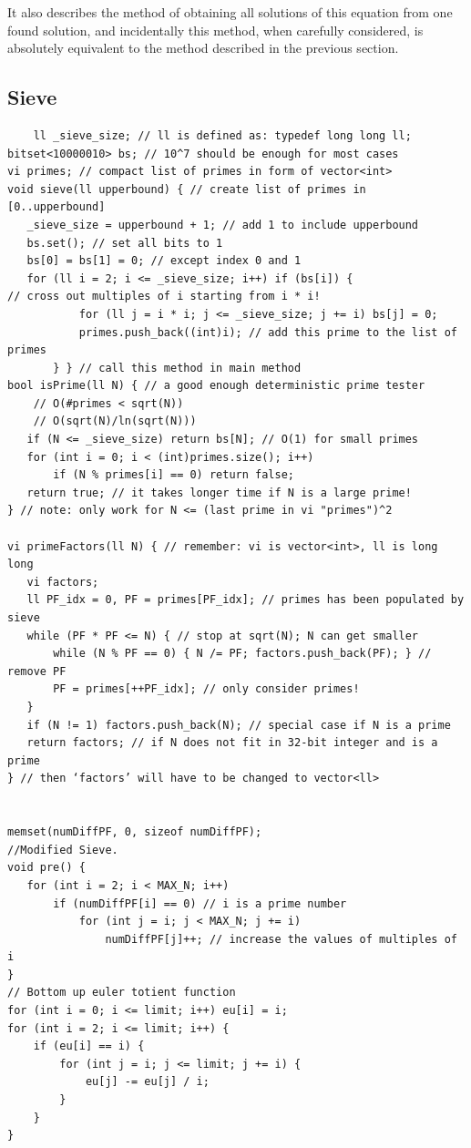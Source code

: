 \documentclass[8pt, a4paper, oneside, twocolumn]{extarticle}
\begin{document}
It also describes the method of obtaining all solutions of this equation from one found solution, and incidentally this method, when carefully considered, is absolutely equivalent to the method described in the previous section.
\subsection{Sieve}
\begin{verbatim}
    ll _sieve_size; // ll is defined as: typedef long long ll;
bitset<10000010> bs; // 10^7 should be enough for most cases
vi primes; // compact list of primes in form of vector<int>
void sieve(ll upperbound) { // create list of primes in [0..upperbound]
   _sieve_size = upperbound + 1; // add 1 to include upperbound
   bs.set(); // set all bits to 1
   bs[0] = bs[1] = 0; // except index 0 and 1
   for (ll i = 2; i <= _sieve_size; i++) if (bs[i]) {
// cross out multiples of i starting from i * i!
           for (ll j = i * i; j <= _sieve_size; j += i) bs[j] = 0;
           primes.push_back((int)i); // add this prime to the list of primes
       } } // call this method in main method
bool isPrime(ll N) { // a good enough deterministic prime tester
    // O(#primes < sqrt(N))
    // O(sqrt(N)/ln(sqrt(N)))
   if (N <= _sieve_size) return bs[N]; // O(1) for small primes
   for (int i = 0; i < (int)primes.size(); i++)
       if (N % primes[i] == 0) return false;
   return true; // it takes longer time if N is a large prime!
} // note: only work for N <= (last prime in vi "primes")^2

vi primeFactors(ll N) { // remember: vi is vector<int>, ll is long long
   vi factors;
   ll PF_idx = 0, PF = primes[PF_idx]; // primes has been populated by sieve
   while (PF * PF <= N) { // stop at sqrt(N); N can get smaller
       while (N % PF == 0) { N /= PF; factors.push_back(PF); } // remove PF
       PF = primes[++PF_idx]; // only consider primes!
   }
   if (N != 1) factors.push_back(N); // special case if N is a prime
   return factors; // if N does not fit in 32-bit integer and is a prime
} // then ‘factors’ will have to be changed to vector<ll>


memset(numDiffPF, 0, sizeof numDiffPF);
//Modified Sieve.
void pre() {
   for (int i = 2; i < MAX_N; i++)
       if (numDiffPF[i] == 0) // i is a prime number
           for (int j = i; j < MAX_N; j += i)
               numDiffPF[j]++; // increase the values of multiples of i
}
// Bottom up euler totient function
for (int i = 0; i <= limit; i++) eu[i] = i;
for (int i = 2; i <= limit; i++) {
    if (eu[i] == i) {
        for (int j = i; j <= limit; j += i) {
            eu[j] -= eu[j] / i;
        }
    }
}
\end{verbatim}
\end{document}
